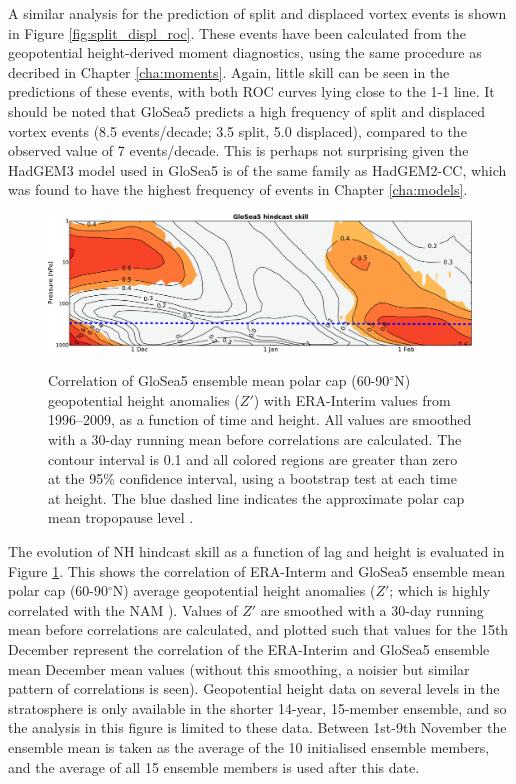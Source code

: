 A similar analysis for the prediction of split and displaced vortex events is
shown in Figure \ref{fig:split_displ_roc}. These events have been calculated
from the geopotential height-derived moment diagnostics, using the same
procedure as decribed in Chapter \ref{cha:moments}. Again, little skill can be
seen in the predictions of these events, with both ROC curves lying close to the
1-1 line. It should be noted that GloSea5 predicts a high frequency of split and
displaced vortex events (8.5 events/decade; 3.5 split, 5.0 displaced), compared
to the observed value of 7 events/decade. This is perhaps not surprising given
the HadGEM3 model used in GloSea5 is of the same family as HadGEM2-CC, which was
found to have the highest frequency of events in Chapter \ref{cha:models}.

\begin{figure}[t] \centering
  \noindent\includegraphics[width=\textwidth,angle=0]{figures/chapter-seasonal/NH_lag_height_corr.pdf}\\
  \caption[Lag-height correlation of NH polar cap geopotential
  height.]{Correlation of GloSea5 ensemble mean polar cap (60-90$^{\circ}$N)
    geopotential height anomalies ($Z'$) with ERA-Interim values from
    1996--2009, as a function of time and height. All values are smoothed with a
    30-day running mean before correlations are calculated. The contour interval
    is 0.1 and all colored regions are greater than zero at the 95\% confidence
    interval, using a bootstrap test at each time at height. The blue dashed
    line indicates the approximate polar cap mean tropopause level
    \citep{Wilcox2012}.}\label{fig:nh_pc_gph_corr}
\end{figure}

\bigskip The evolution of NH hindcast skill as a function of lag and height is
evaluated in Figure \ref{fig:nh_pc_gph_corr}. This shows the correlation of
ERA-Interm and GloSea5 ensemble mean polar cap (60-90$^\circ$N) average
geopotential height anomalies ($Z'$; which is highly correlated with the NAM
\citep{Kushner2010}). Values of $Z'$ are smoothed with a 30-day running mean
before correlations are calculated, and plotted such that values for the 15th
December represent the correlation of the ERA-Interim and GloSea5 ensemble mean
December mean values (without this smoothing, a noisier but similar pattern of
correlations is seen). Geopotential height data on several levels in the
stratosphere is only available in the shorter 14-year, 15-member ensemble, and
so the analysis in this figure is limited to these data. Between 1st-9th
November the ensemble mean is taken as the average of the 10 initialised
ensemble members, and the average of all 15 ensemble members is used after this
date.

